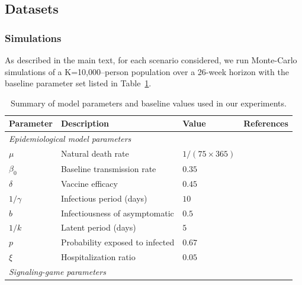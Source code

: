 \documentclass[sigconf,review]{acmart}
\begin{document}
\subsection{Datasets}
\label{data}
\subsubsection{Simulations}
As described in the main text, for each scenario considered, we run Monte-Carlo simulations of a K=10{,}000–person population over a 26-week horizon with the baseline parameter set listed in Table~\ref{tab:param-summary}.


\begin{table}[h]
\begin{minipage}{\textwidth}
\centering
\caption{Summary of model parameters and baseline values used in our experiments.}
\label{tab:param-summary}
\begin{tabular}{l|l|l|l}
\toprule
\textbf{Parameter} & \textbf{Description} & \textbf{Value} & \textbf{References} \\
\midrule
\multicolumn{4}{l}{\textit{Epidemiological model parameters}} \\
\midrule
$\mu$         & Natural death rate                         & $1/(75 \times 365)$ & ~\cite{Longini2004}\\
$\beta_0$     & Baseline transmission rate                 & $0.35$ & ~\cite{JING2021}\\
$\delta$      & Vaccine efficacy                                      & $0.45$ & ~\cite{Dawood2020}\\
$1/\gamma$    & Infectious period (days)                              & $10$ & ~\cite{Walsh2020}\\
$b$           & Infectiousness of asymptomatic                        & $0.5$ & ~\cite{Longini2004}\\
$1/k$         & Latent period (days)                                  & $5$ & ~\cite{RELUGA2011}\\
$p$           & Probability exposed to infected                       & $0.67$ &~\cite{Longini2004}\\
$\xi$         & Hospitalization ratio                                 & $0.05$ & ~\cite{FoxPNAS2022} \\
\midrule
\multicolumn{4}{l}{\textit{Signaling-game parameters}} \\

\end{tabular}
\end{minipage}
\end{table}
\end{document}
